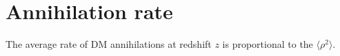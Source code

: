 \section{Annihilation rate}

The average rate of DM annihilations at redshift $z$ is proportional to the $\langle \rho^2 \rangle$. 
